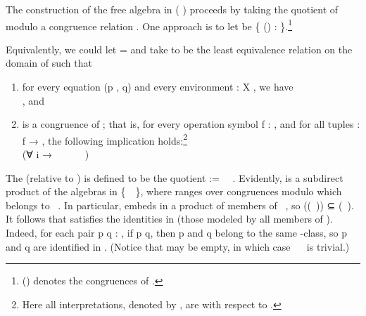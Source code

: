 The construction of the free algebra in  ( )
proceeds by taking the quotient of  modulo a congruence relation .  One approach is to let
 be \{   () :  \af{/}   
\}.\footnote{ () denotes the congruences of .}

\ifshort\else
Equivalently, we could let  =   and take  to be the least equivalence relation
on the domain of  such that
\begin{enumerate}
\item for every equation (\ab p , \ab q)    and every
environment  : \ab X  , we have\\
      , and
\item {} is a congruence of ; that is, for every operation symbol \ab
f : , and for all tuples   :  \ab f
→ , the following implication holds:\footnote{Here all
interpretations, denoted by , are with respect to .}\\[-8pt]

(∀ i → ~~~~~~)
 ~~~~~~\\[-8pt]
\end{enumerate}
\fi

The   (relative to
) is defined to be the quotient  := ~\af{/}~.
Evidently,  is a subdirect product of the algebras in \{~\af{/}~\!\},
where  ranges over congruences modulo which  belongs to ~.
In particular,  embeds in a product of members of ~, so
  ((~)) ⊆ (~). It follows
that  satisfies the identities in   (those modeled by all members of
).  Indeed, for each pair \ab p \ab q : , if   \ab p  \ab
q, then \ab p and \ab q belong to the same -class, so \ab p and \ab q are
identified in . \ifshort\else (Notice that  may be empty, in which case
~\af{/}~ is trivial.) \fi

